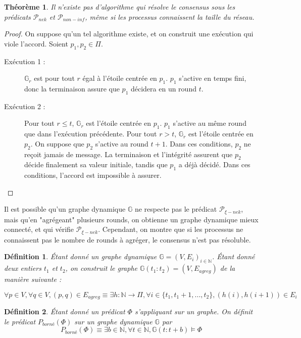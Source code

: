 \documentclass{article}
\newtheorem{theorem}{Théorème}
\newtheorem{definition}{Définition}
\begin{document}
\begin{theorem}
	Il n'existe pas d'algorithme qui résolve le consensus sous les prédicats $\mathcal{P}_{nek}$ et $\mathcal{P}_{non-inf}$, même si les processus connaissent la taille du réseau.
\end{theorem}
\begin{proof}
	On suppose qu'un tel algorithme existe, et on construit une exécution qui viole l'accord.
	Soient $p_1, p_2 \in \Pi$.
	\begin{description}

		\item[Exécution 1 :] $\mathds{G}_r$ est pour tout $r$ égal à l'étoile centrée en $p_1$. $p_1$ s'active en temps fini, donc la terminaison assure que $p_1$ décidera en un round $t$.
		\item[Exécution 2 :] Pour tout $r \leq t$, $\mathds{G}_r$ est l'étoile centrée en $p_1$. $p_1$ s'active au même round que dans l'exécution précédente.
			Pour tout $r > t$, $\mathds{G}_r$ est l'étoile centrée en $p_2$. On suppose que $p_2$ s'active au round $t+1$.
			Dans ces conditions, $p_2$ ne reçoit jamais de message. La terminaison et l'intégrité assurent que $p_2$ décide finalement sa valeur initiale,
			tandis que $p_1$ a déjà décidé. Dans ces conditions, l'accord est impossible à assurer.

	\end{description}
\end{proof}

Il est possible qu'un graphe dynamique $\mathds{G}$ ne respecte pas le prédicat $\mathcal{P}_{\xi-nek}$, mais qu'en "agrégeant" plusieurs rounds, on obtienne un graphe dynamique mieux connecté,
et qui vérifie $\mathcal{P}_{\xi-nek}$.
Cependant, on montre que si les processus ne connaissent pas le nombre de rounds à agréger, le consensus n'est pas résoluble.

\begin{definition}
	Étant donné un graphe dynamique $\mathds{G} = (V, E_i)_{i \in \mathds{N}}$.
	Étant donné deux entiers $t_1$ et $t_2$, on construit le graphe $\mathds{G}(t_1 : t_2) = (V, E_{agreg})$ de la manière suivante :

	$$\forall p \in V, \forall q \in V, (p, q) \in E_{agreg} \equiv \exists h : \mathds{N} \rightarrow \Pi, \forall i \in \{t_1, t_1 + 1, ..., t_2\}, (h(i), h(i+1)) \in E_i$$
\end{definition}

\begin{definition}
	Étant donné un prédicat $\Phi$ s'appliquant sur un graphe.
	On définit le prédicat $P_{borné}(\Phi)$ sur un graphe dynamique
	$\mathds{G}$ par $$P_{borné}(\Phi) \equiv \exists b \in \mathds{N}, \forall t \in \mathds{N}, \mathds{G}(t:t+b) \models \Phi$$
\end{definition}
\end{document}
